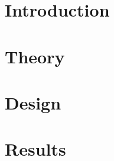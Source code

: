 
	\fontfamily{\sfdefault}\selectfont 
	\thispagestyle{nohdr}
	\null\pagebreak
	\thispagestyle{nohdr}
	\null\pagebreak
	\tableofcontents
	\pagebreak
	\listoffigures
	\listoftables


	\fontfamily{\rmdefault}\selectfont 
	\pagebreak
	\FloatBarrier
	
	\FloatBarrier\pagebreak
	\null

	\pagebreak\FloatBarrier

	\section{Introduction}\label{intro}
	
	\pagebreak\FloatBarrier

	\section{Theory}\label{theory}
	
	\FloatBarrier\newpage
	\section{Design}\label{design}
	
	
	\FloatBarrier\pagebreak
	\section{Results}\label{results}
	

